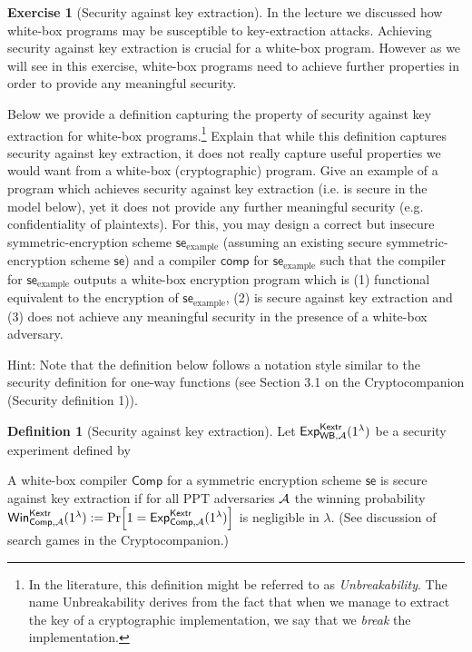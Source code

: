 \documentclass[envcountsame,runningheads,notitlepage]{../llncs}
\theoremstyle{definition}
\newtheorem{graded}[crossed]{Exercise}
\renewcommand{\O}[1]{\ensuremath{\mathsf{#1}}}
\newtheorem*{definition*}{Definition}
\renewcommand{\O}[1]{\ensuremath{\mathsf{#1}}}
\newcommand{\WB}{\textsf{WB}}
\newcommand{\Comp}{\textsf{Comp}}
\begin{document}
\begin{graded}[Security against key extraction]

In the lecture we discussed how white-box programs may be susceptible to key-extraction attacks. Achieving security against key extraction is crucial for a white-box program. However as we will see in this exercise, white-box programs need to achieve further properties in order to provide any meaningful security.

Below we provide a definition capturing the property of security against key extraction for white-box programs.\footnote{In the literature, this definition might be referred to as \emph{Unbreakability}. The name Unbreakability derives from the fact that when we manage to extract the key of a cryptographic implementation, we say that we \emph{break} the implementation.} Explain that while this definition captures security against key extraction, it does not really capture useful properties we would want from a white-box (cryptographic) program. Give an example of a program which achieves security against key extraction (i.e. is secure in the model below), yet it does not provide any further meaningful security (e.g. confidentiality of plaintexts). For this, you may design a correct but insecure symmetric-encryption scheme $\O{se}_\text{example}$ (assuming an existing secure symmetric-encryption scheme $\O{se}$) and a compiler $\O{comp}$ for $\O{se}_\text{example}$ such that the compiler for $\O{se}_\text{example}$ outputs a white-box encryption program which is (1) functional equivalent to the encryption of $\O{se}_\text{example}$, (2) is secure against key extraction and (3) does not achieve any meaningful security in the presence of a white-box adversary.

Hint:  Note that the definition below follows a notation style similar to the security definition for one-way functions (see Section 3.1 on the Cryptocompanion (Security definition 1)).


\begin{definition*}[Security against key extraction]\label{secdef:KE}
Let ${\mathsf{Exp}}_{\WB,\adv}^{\mathsf{Kextr}}(1^\lambda)$ be a security experiment defined by
\begin{center}
	  \procedure{${\mathsf{Exp}}_{\Comp,\adv}^{\mathsf{Kextr}}(1^\lambda)$}{
		k \sample \{0,1\}^\lambda \\
		\WB \sample\Comp(k)		\\
		k^* \sample \adv(\WB) \\
		\pcif k^*=k \pcthen\\
		\pcind \pcreturn 1\\
		\pcreturn 0}
\end{center}
A white-box compiler $\Comp$ for a symmetric encryption scheme $\O{se}$ is secure against key extraction if for all PPT adversaries $\mathcal{A}$ the winning probability $\mathsf{Win}^{\mathsf{Kextr}}_{\Comp,\adv}(1^\lambda):=\prob{1={\mathsf{Exp}}_{\Comp,\adv}^{\mathsf{Kextr}}(1^\lambda)}$ is negligible in $\lambda$. (See discussion of search games in the Cryptocompanion.)
\end{definition*}

\end{graded}
\end{document}
